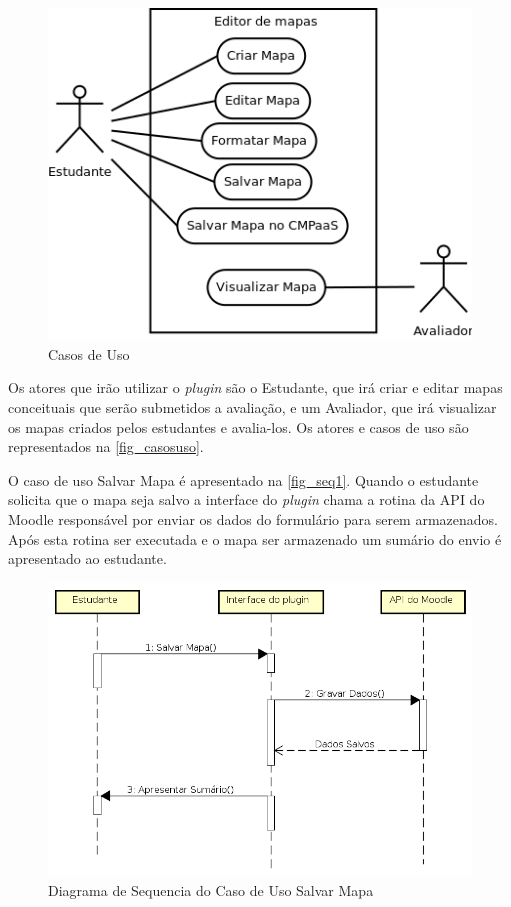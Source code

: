 \documentclass[
	12pt,				%
	openright,			%
	oneside,			%
	a4paper,			%
	english,			%
	french,				%
	spanish,			%
	brazil				%
	]{abntex2}
\begin{document}
\begin{figure}[!h]
	\caption{\label{fig_casosuso} Casos de Uso}
	\begin{center}
		\includegraphics[scale=0.7]{casosuso.png}
	\end{center}
\end{figure} 

Os atores que irão utilizar o \textit{plugin} são o Estudante, que irá criar e editar mapas conceituais que serão submetidos a avaliação, e um Avaliador, que irá visualizar os mapas criados pelos estudantes e avalia-los. Os atores e casos de uso são representados na \autoref{fig_casosuso}.

O caso de uso Salvar Mapa é apresentado na \autoref{fig_seq1}. Quando o estudante solicita que o mapa seja salvo a interface do \textit{plugin} chama a rotina da API do Moodle responsável por enviar os dados do formulário para serem armazenados. Após esta rotina ser executada e o mapa ser armazenado um sumário do envio é apresentado ao estudante.

\begin{figure}[htb]
	\caption{\label{fig_seq1} Diagrama de Sequencia do Caso de Uso Salvar Mapa}
	\begin{center}
		\includegraphics[scale=0.5]{SeqDiagramPlugin.png}
	\end{center}
\end{figure} 
\end{document}
